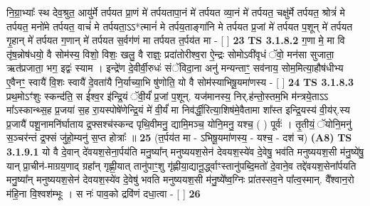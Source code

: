 \documentclass[17pt]{extarticle}
\begin{document}
                  नि॒ग्रा॒भ्याः᳚ स्थ देव॒श्रुत॒ आयु॑र्मे तर्पयत प्रा॒णं मे॑ तर्पयतापा॒नं मे॑ तर्पयत व्या॒नं मे॑ तर्पयत॒ चक्षु॑र्मे तर्पयत॒ श्रोत्रं॑ मे तर्पयत॒ मनो॑मे तर्पयत॒ वाचं॑ मे तर्पयता॒ऽऽ*त्मानं॑ मे तर्पय॒ताङ्गा॑नि मे तर्पयत प्र॒जां मे॑ तर्पयत प॒शून् मे॑ तर्पयत गृ॒हान् मे॑ तर्पयत ग॒णान् मे॑ तर्पयत स॒र्वग॑णं मा तर्पयत त॒र्पय॑त मा - [  ] \textbf{  23} \newline
                  \newline
                                \textbf{ TS 3.1.8.2} \newline
                  ग॒णा मे॒ मा वि तृ॑ष॒न्नोष॑धयो॒ वै सोम॑स्य॒ विशो॒ विशः॒ खलु॒ वै राज्ञ्ः॒ प्रदा॑तोरीश्व॒रा ऐ॒न्द्रः सोमोऽवी॑वृधं ॅवो॒ मन॑सा सुजाता॒ ऋत॑प्रजाता॒ भग॒ इद्वः॑ स्याम । इन्द्रे॑ण दे॒वीर्वी॒रुधः॑ संॅविदा॒ना अनु॑ मन्यन्ताꣳ॒॒ सव॑नाय॒ सोम॒मित्या॒हौष॑धीभ्य ए॒वैनꣳ॒॒ स्वायै॑ वि॒शः स्वायै॑ दे॒वता॑यै नि॒र्याच्या॒भि षु॑णोति॒ यो वै सोम॑स्याभिषू॒यमा॑णस्य - [  ] \textbf{  24} \newline
                  \newline
                                \textbf{ TS 3.1.8.3} \newline
                  प्रथ॒मोऽꣳ॑शुः स्कन्द॑ति॒ स ई᳚श्व॒र इ॑न्द्रि॒यं ॅवी॒र्यं॑ प्र॒जां प॒शून्. यज॑मानस्य॒ निर्.ह॑न्तो॒स्तम॒भि म॑न्त्रये॒ताऽऽ मा᳚ऽस्कान्थ्स॒ह प्र॒जया॑ स॒ह रा॒यस्पोषे॑णेन्द्रि॒यं मे॑ वी॒र्यं॑ मा निव॑र्द्धी॒रित्या॒शिष॑मे॒वैतामा शा᳚स्त इन्द्रि॒यस्य॑ वी॒य॑र्.स्य प्र॒जायै॑ पशू॒नामनि॑र्घाताय द्र॒फ्सश्च॑स्कन्द पृथि॒वीमनु॒ द्यामि॒मञ्च॒ योनि॒मनु॒ यश्च॒ ( ) पूर्वः॑ । तृ॒तीयं॒ ॅयोनि॒मनु॑ स॒ञ्चर॑न्तं द्र॒फ्सं जु॑हो॒म्यनु॑ स॒प्त होत्राः᳚ ॥ \textbf{  25} \newline
                  \newline
                      (त॒र्पय॑त मा - ऽभिषू॒यमा॑णस्य॒ - यश्च॒ - दश॑ च)  \textbf{(A8)} \newline \newline
                                        \textbf{ TS 3.1.9.1} \newline
                  यो वै दे॒वान् दे॑वयश॒सेना॒र्पय॑ति मनु॒ष्या᳚न् मनुष्ययश॒सेन॑ देवयश॒स्ये॑व दे॒वेषु॒ भव॑ति मनुष्ययश॒सी म॑नु॒ष्ये॑षु॒ यान् प्रा॒चीन॑-माग्रय॒णाद् ग्रहा᳚न् गृह्णी॒यात् तानु॑पाꣳ॒॒शु गृ॑ह्णीया॒द्यानू॒र्द्ध्वाꣳस्तानु॑पब्दि॒मतो॑ दे॒वाने॒व तद्दे॑वयश॒सेना᳚र्पयति मनु॒ष्या᳚न् मनुष्ययश॒सेन॑ देवयश॒स्ये॑व दे॒वेषु॑ भवति मनुष्ययश॒सी म॑नु॒ष्ये᳚ष्व॒ग्निः प्रा॑तस्सव॒ने पा᳚त्व॒स्मान्. वै᳚श्वान॒रो म॑हि॒ना वि॒श्वश॑म्भूः । स नः॑ पाव॒को द्रवि॑णं दधा॒त्वा - [  ] \textbf{  26} \newline
                  \newline
\end{document}
